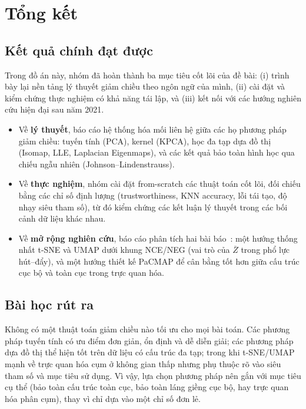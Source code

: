 \section{Tổng kết}

\subsection{Kết quả chính đạt được}

Trong đồ án này, nhóm đã hoàn thành ba mục tiêu cốt lõi của đề bài: (i) trình bày lại nền tảng lý thuyết giảm chiều theo ngôn ngữ của mình, (ii) cài đặt và kiểm chứng thực nghiệm có khả năng tái lập, và (iii) kết nối với các hướng nghiên cứu hiện đại sau năm 2021.

\begin{itemize}
  \item Về \textbf{lý thuyết}, báo cáo hệ thống hóa mối liên hệ giữa các họ phương pháp giảm chiều: tuyến tính (PCA), kernel (KPCA), học đa tạp dựa đồ thị (Isomap, LLE, Laplacian Eigenmaps), và các kết quả bảo toàn hình học qua chiếu ngẫu nhiên (Johnson--Lindenstrauss).
  \item Về \textbf{thực nghiệm}, nhóm cài đặt from-scratch các thuật toán cốt lõi, đối chiếu bằng các chỉ số định lượng (trustworthiness, KNN accuracy, lỗi tái tạo, độ nhạy siêu tham số), từ đó kiểm chứng các kết luận lý thuyết trong các bối cảnh dữ liệu khác nhau.
  \item Về \textbf{mở rộng nghiên cứu}, báo cáo phân tích hai bài báo~\cite{damrich2023contrastive,wang2021pacmap}: một hướng thống nhất t-SNE và UMAP dưới khung NCE/NEG (vai trò của $\overline{Z}$ trong phổ lực hút--đẩy), và một hướng thiết kế PaCMAP để cân bằng tốt hơn giữa cấu trúc cục bộ và toàn cục trong trực quan hóa.
\end{itemize}

\subsection{Bài học rút ra}

Không có một thuật toán giảm chiều nào tối ưu cho mọi bài toán. Các phương pháp tuyến tính có ưu điểm đơn giản, ổn định và dễ diễn giải; các phương pháp dựa đồ thị thể hiện tốt trên dữ liệu có cấu trúc đa tạp; trong khi t-SNE/UMAP mạnh về trực quan hóa cụm ở không gian thấp nhưng phụ thuộc rõ vào siêu tham số và mục tiêu sử dụng. Vì vậy, lựa chọn phương pháp nên gắn với mục tiêu cụ thể (bảo toàn cấu trúc toàn cục, bảo toàn láng giềng cục bộ, hay trực quan hóa phân cụm), thay vì chỉ dựa vào một chỉ số đơn lẻ.

